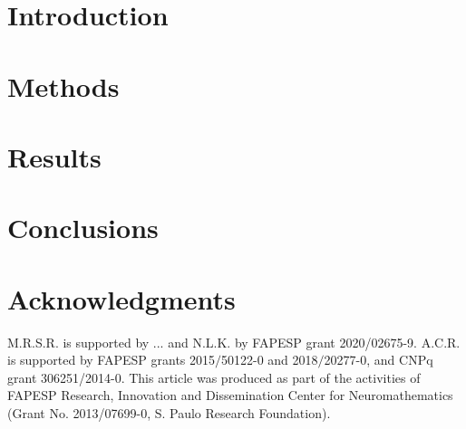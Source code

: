 \section*{Introduction}

\section*{Methods}

\section*{Results}

\section*{Conclusions}

\section*{Acknowledgments}

M.R.S.R. is supported by ... and N.L.K. by FAPESP grant 2020/02675-9. A.C.R. is supported by FAPESP grants 2015$/$50122-0 and 2018$/$20277-0, and CNPq grant 306251/2014-0.
This article was produced as part of the activities of FAPESP  Research, Innovation and Dissemination Center for Neuromathematics (Grant No. 2013/07699-0, S. Paulo Research Foundation).